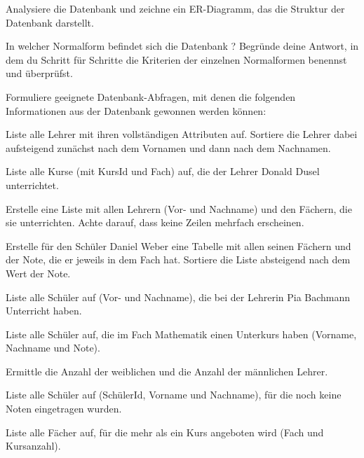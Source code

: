 \begin{compactenum}[a)]
\item Analysiere die Datenbank und zeichne ein ER-Diagramm, das die Struktur der
Datenbank darstellt.

\item In welcher Normalform befindet sich die Datenbank ?
Begründe deine Antwort, in dem du Schritt für Schritte die Kriterien der
einzelnen Normalformen benennst und überprüfst.

\item Formuliere geeignete Datenbank-Abfragen, mit denen die folgenden
Informationen aus der Datenbank  gewonnen werden können:

\begin{compactenum}[1.]
\item Liste alle Lehrer mit ihren vollständigen Attributen auf. Sortiere die
Lehrer dabei aufsteigend zunächst nach dem Vornamen und dann nach dem Nachnamen.

\item Liste alle Kurse (mit KursId und Fach) auf, die der Lehrer Donald Dusel
 unterrichtet.

\item Erstelle eine Liste mit allen Lehrern (Vor- und Nachname) und den Fächern,
die sie unterrichten. Achte darauf, dass keine Zeilen mehrfach erscheinen.

\item Erstelle für den Schüler Daniel Weber eine Tabelle mit allen seinen
Fächern und der Note, die er jeweils in dem Fach hat. Sortiere die Liste
absteigend nach dem Wert der Note.

\item Liste alle Schüler auf (Vor- und Nachname), die bei der Lehrerin Pia
Bachmann Unterricht haben.

\item Liste alle Schüler auf, die im Fach Mathematik einen Unterkurs haben
(Vorname, Nachname und Note).

\item Ermittle die Anzahl der weiblichen und die Anzahl der männlichen Lehrer.

\item Liste alle Schüler auf (SchülerId, Vorname und Nachname), für die noch
keine Noten eingetragen wurden.

\item Liste alle Fächer auf, für die mehr als ein Kurs angeboten wird (Fach und
 Kursanzahl).


\end{compactenum}
\end{compactenum}
